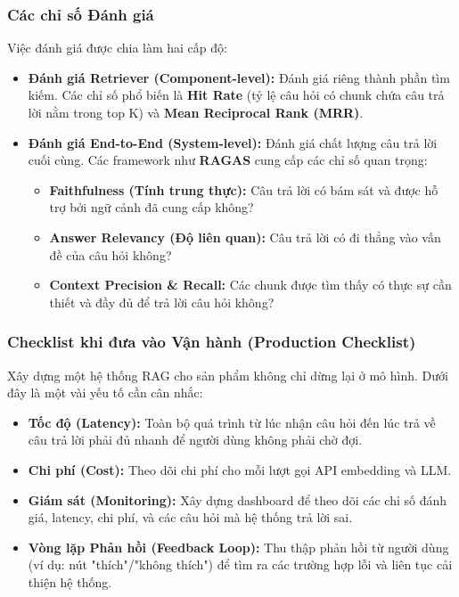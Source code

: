 \subsubsection{Các chỉ số Đánh giá}
Việc đánh giá được chia làm hai cấp độ:
\begin{itemize}
    \item \textbf{Đánh giá Retriever (Component-level):} Đánh giá riêng thành phần tìm kiếm. Các chỉ số phổ biến là \textbf{Hit Rate} (tỷ lệ câu hỏi có chunk chứa câu trả lời nằm trong top K) và \textbf{Mean Reciprocal Rank (MRR)}.
    \item \textbf{Đánh giá End-to-End (System-level):} Đánh giá chất lượng câu trả lời cuối cùng. Các framework như \textbf{RAGAS} cung cấp các chỉ số quan trọng:
        \begin{itemize}
            \item \textbf{Faithfulness (Tính trung thực):} Câu trả lời có bám sát và được hỗ trợ bởi ngữ cảnh đã cung cấp không?
            \item \textbf{Answer Relevancy (Độ liên quan):} Câu trả lời có đi thẳng vào vấn đề của câu hỏi không?
            \item \textbf{Context Precision \& Recall:} Các chunk được tìm thấy có thực sự cần thiết và đầy đủ để trả lời câu hỏi không?
        \end{itemize}
\end{itemize}

\subsubsection{Checklist khi đưa vào Vận hành (Production Checklist)}
Xây dựng một hệ thống RAG cho sản phẩm không chỉ dừng lại ở mô hình. Dưới đây là một vài yếu tố cần cân nhắc:
\begin{itemize}
    \item \textbf{Tốc độ (Latency):} Toàn bộ quá trình từ lúc nhận câu hỏi đến lúc trả về câu trả lời phải đủ nhanh để người dùng không phải chờ đợi.
    \item \textbf{Chi phí (Cost):} Theo dõi chi phí cho mỗi lượt gọi API embedding và LLM.
    \item \textbf{Giám sát (Monitoring):} Xây dựng dashboard để theo dõi các chỉ số đánh giá, latency, chi phí, và các câu hỏi mà hệ thống trả lời sai.
    \item \textbf{Vòng lặp Phản hồi (Feedback Loop):} Thu thập phản hồi từ người dùng (ví dụ: nút "thích"/"không thích") để tìm ra các trường hợp lỗi và liên tục cải thiện hệ thống.
\end{itemize}